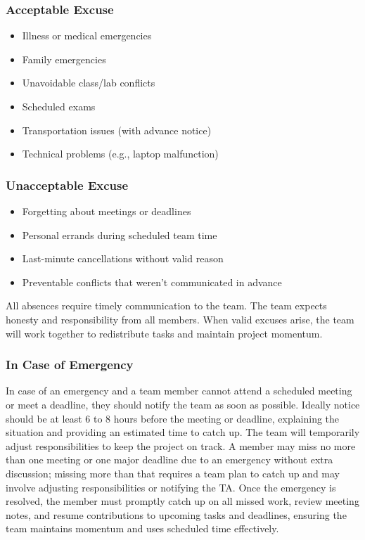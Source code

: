 \documentclass{article}
\begin{document}
\subsubsection*{Acceptable Excuse}
\begin{itemize}
  \item Illness or medical emergencies
  \item Family emergencies
  \item Unavoidable class/lab conflicts
  \item Scheduled exams
  \item Transportation issues (with advance notice)
  \item Technical problems (e.g., laptop malfunction)
\end{itemize}

\subsubsection*{Unacceptable Excuse}
\begin{itemize}
  \item Forgetting about meetings or deadlines
  \item Personal errands during scheduled team time
  \item Last-minute cancellations without valid reason
  \item Preventable conflicts that weren't communicated in advance
\end{itemize}

All absences require timely communication to the team. The team expects honesty and responsibility 
from all members. When valid excuses arise, the team will work together to redistribute tasks and 
maintain project momentum.

\subsubsection*{In Case of Emergency}

In case of an emergency and a team member cannot attend a scheduled meeting or meet a deadline, they should 
notify the team as soon as possible. Ideally notice should be at least 6 to 8 hours before the meeting or deadline, explaining 
the situation and providing an estimated time to catch up. The team will temporarily adjust responsibilities to 
keep the project on track. A member may miss no more than one meeting or one major deadline due to an emergency without 
extra discussion; missing more than that requires a team plan to catch up and may involve adjusting responsibilities or 
notifying the TA. Once the emergency is resolved, the member must promptly catch up on all missed work, review meeting notes, 
and resume contributions to upcoming tasks and deadlines, ensuring the team maintains momentum and uses scheduled time effectively.
\end{document}
